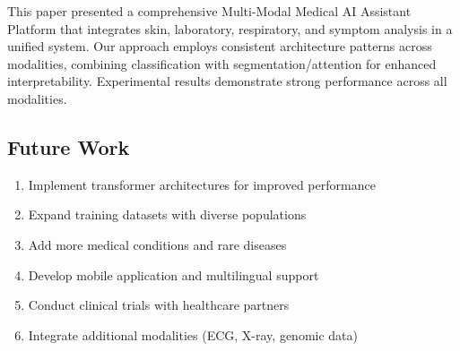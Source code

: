 \documentclass[conference]{IEEEtran}
\begin{document}
This paper presented a comprehensive Multi-Modal Medical AI Assistant Platform that integrates skin, laboratory, respiratory, and symptom analysis in a unified system. Our approach employs consistent architecture patterns across modalities, combining classification with segmentation/attention for enhanced interpretability. Experimental results demonstrate strong performance across all modalities.

\subsection{Future Work}

\begin{enumerate}
\item Implement transformer architectures for improved performance
\item Expand training datasets with diverse populations
\item Add more medical conditions and rare diseases
\item Develop mobile application and multilingual support
\item Conduct clinical trials with healthcare partners
\item Integrate additional modalities (ECG, X-ray, genomic data)
\end{enumerate}
\end{document}
